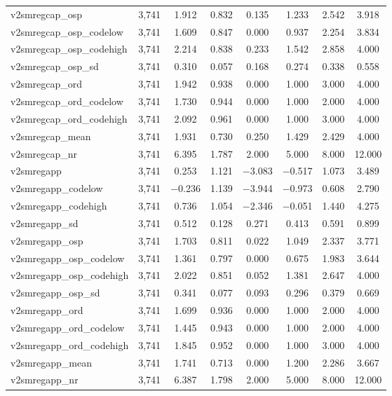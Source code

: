 \begin{table}[!htbp]
\begin{tabular}{@{\extracolsep{5pt}}lccccccc}
v2smregcap\_osp & 3,741 & 1.912 & 0.832 & 0.135 & 1.233 & 2.542 & 3.918 \\ 
v2smregcap\_osp\_codelow & 3,741 & 1.609 & 0.847 & 0.000 & 0.937 & 2.254 & 3.834 \\ 
v2smregcap\_osp\_codehigh & 3,741 & 2.214 & 0.838 & 0.233 & 1.542 & 2.858 & 4.000 \\ 
v2smregcap\_osp\_sd & 3,741 & 0.310 & 0.057 & 0.168 & 0.274 & 0.338 & 0.558 \\ 
v2smregcap\_ord & 3,741 & 1.942 & 0.938 & 0.000 & 1.000 & 3.000 & 4.000 \\ 
v2smregcap\_ord\_codelow & 3,741 & 1.730 & 0.944 & 0.000 & 1.000 & 2.000 & 4.000 \\ 
v2smregcap\_ord\_codehigh & 3,741 & 2.092 & 0.961 & 0.000 & 1.000 & 3.000 & 4.000 \\ 
v2smregcap\_mean & 3,741 & 1.931 & 0.730 & 0.250 & 1.429 & 2.429 & 4.000 \\ 
v2smregcap\_nr & 3,741 & 6.395 & 1.787 & 2.000 & 5.000 & 8.000 & 12.000 \\ 
v2smregapp & 3,741 & 0.253 & 1.121 & $-$3.083 & $-$0.517 & 1.073 & 3.489 \\ 
v2smregapp\_codelow & 3,741 & $-$0.236 & 1.139 & $-$3.944 & $-$0.973 & 0.608 & 2.790 \\ 
v2smregapp\_codehigh & 3,741 & 0.736 & 1.054 & $-$2.346 & $-$0.051 & 1.440 & 4.275 \\ 
v2smregapp\_sd & 3,741 & 0.512 & 0.128 & 0.271 & 0.413 & 0.591 & 0.899 \\ 
v2smregapp\_osp & 3,741 & 1.703 & 0.811 & 0.022 & 1.049 & 2.337 & 3.771 \\ 
v2smregapp\_osp\_codelow & 3,741 & 1.361 & 0.797 & 0.000 & 0.675 & 1.983 & 3.644 \\ 
v2smregapp\_osp\_codehigh & 3,741 & 2.022 & 0.851 & 0.052 & 1.381 & 2.647 & 4.000 \\ 
v2smregapp\_osp\_sd & 3,741 & 0.341 & 0.077 & 0.093 & 0.296 & 0.379 & 0.669 \\ 
v2smregapp\_ord & 3,741 & 1.699 & 0.936 & 0.000 & 1.000 & 2.000 & 4.000 \\ 
v2smregapp\_ord\_codelow & 3,741 & 1.445 & 0.943 & 0.000 & 1.000 & 2.000 & 4.000 \\ 
v2smregapp\_ord\_codehigh & 3,741 & 1.845 & 0.952 & 0.000 & 1.000 & 3.000 & 4.000 \\ 
v2smregapp\_mean & 3,741 & 1.741 & 0.713 & 0.000 & 1.200 & 2.286 & 3.667 \\ 
v2smregapp\_nr & 3,741 & 6.387 & 1.798 & 2.000 & 5.000 & 8.000 & 12.000 \\ 

\end{tabular}
\end{table}
